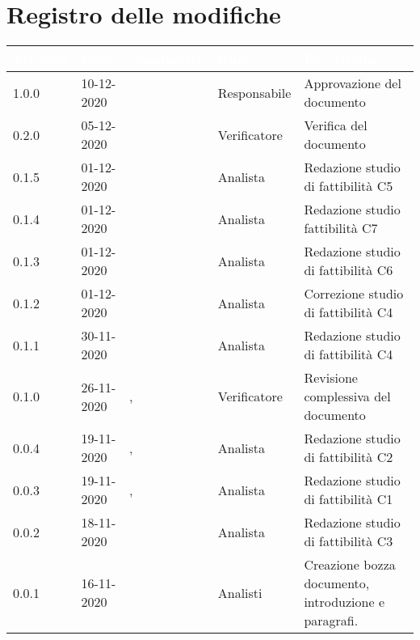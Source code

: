 \section*{Registro delle modifiche}
{
\renewcommand{\arraystretch}{1.5}
\centering
\begin{longtable}{C{1.7cm} C{2.5cm} C{3.2cm} C{2.7cm} C{4.8cm}}
\textcolor{white}{\textbf{Versione}}&
\textcolor{white}{\textbf{Data}}&
\textcolor{white}{\textbf{Nominativo}}&
\textcolor{white}{\textbf{Ruolo}}&
\textcolor{white}{\textbf{Descrizione}}\\	
\endhead

1.0.0 & 10-12-2020 & \BM{} & Responsabile & Approvazione del documento\\  
0.2.0 & 05-12-2020 & \SG{} & Verificatore & Verifica del documento\\
0.1.5 & 01-12-2020 & \SH{} & Analista & Redazione studio di fattibilità C5\\
0.1.4 & 01-12-2020 & \PA{} & Analista & Redazione studio fattibilità C7\\
0.1.3 & 01-12-2020 & \RA{} & Analista & Redazione studio di fattibilità C6\\
0.1.2 & 01-12-2020 & \ZM{} & Analista & Correzione studio di fattibilità C4\\
0.1.1 & 30-11-2020 & \ZM{} & Analista & Redazione studio di fattibilità C4\\
0.1.0 & 26-11-2020 & \SG{}, \BM{} & Verificatore & Revisione complessiva del documento\\
0.0.4 & 19-11-2020 & \ZM{}, \SP{} & Analista & Redazione studio di fattibilità C2\\
0.0.3 & 19-11-2020 & \ZM{}, \SP{} & Analista & Redazione studio di fattibilità C1\\		
0.0.2 & 18-11-2020 & \PA{} & Analista & Redazione studio di fattibilità C3\\
0.0.1 & 16-11-2020 & \Gruppo{} & Analisti & Creazione bozza documento, introduzione e paragrafi. \\	
\end{longtable}
}
